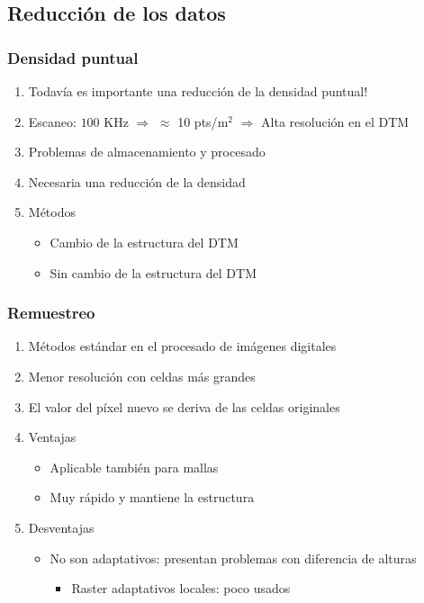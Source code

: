\subsection{Reducción de los datos}
\begin{frame}
  \frametitle{Densidad puntual}
  \begin{enumerate}
    \item \alert{Todavía} es importante una reducción de la densidad
      puntual\alert{!}
    \item Escaneo: $100$ KHz $\Rightarrow$ \alert{$\approx$ 10
      pts/$\mathrm{m}^2$} $\Rightarrow$ Alta resolución en el DTM
    \item Problemas de almacenamiento y procesado
    \item Necesaria una reducción de la densidad
    \item Métodos
      \begin{itemize}
        \item Cambio de la estructura del DTM
        \item Sin cambio de la estructura del DTM
      \end{itemize}
  \end{enumerate}
\end{frame}
\begin{frame}
  \frametitle{Remuestreo}
  \begin{enumerate}
    \item Métodos estándar en el procesado de imágenes digitales
    \item Menor resolución con celdas más grandes
    \item El valor del píxel nuevo se deriva de las celdas originales
    \item \alert{Ventajas}
      \begin{itemize}
        \item Aplicable también para mallas
        \item Muy rápido y mantiene la estructura
      \end{itemize}
    \item \alert{Desventajas}
      \begin{itemize}
        \item No son adaptativos: presentan problemas con diferencia de alturas
         \begin{itemize}
           \item Raster adaptativos locales: \alert{poco usados}
         \end{itemize}
      \end{itemize}
  \end{enumerate}
\end{frame}
